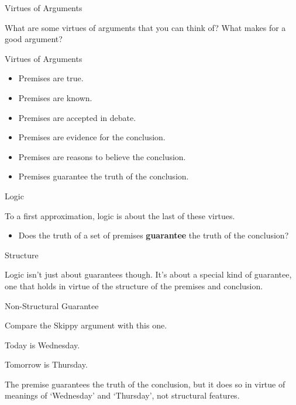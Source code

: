 \documentclass[ignorenonframetext,]{beamer}
\providecommand{\tightlist}{%
  \setlength{\itemsep}{0pt}\setlength{\parskip}{0pt}}
\renewcommand{\,}{\text{, }}
\renewenvironment*{quote}	
	{\list{}{\rightmargin   \leftmargin} \item } 	
	{\endlist }
\newcommand{\DisplayArg}[2]{
\begin{enumerate}
{#1}
\end{enumerate}
\vspace{-6pt}
\hrulefill

\begin{quote}
{\normalfont #2}
\end{quote}
\vspace{12pt}
}
\begin{document}
\begin{frame}{Virtues of Arguments}
\protect\hypertarget{virtues-of-arguments}{}

What are some virtues of arguments that you can think of? What makes for
a good argument?

\end{frame}

\begin{frame}{Virtues of Arguments}
\protect\hypertarget{virtues-of-arguments-1}{}

\begin{itemize}
\tightlist
\item
  Premises are true.
\item
  Premises are known.
\item
  Premises are accepted in debate.
\item
  Premises are evidence for the conclusion.
\item
  Premises are reasons to believe the conclusion.
\item
  Premises guarantee the truth of the conclusion.
\end{itemize}

\end{frame}

\begin{frame}{Logic}
\protect\hypertarget{logic}{}

To a first approximation, logic is about the last of these virtues.

\begin{itemize}
\tightlist
\item
  Does the truth of a set of premises \textbf{guarantee} the truth of
  the conclusion?
\end{itemize}

\end{frame}

\begin{frame}{Structure}
\protect\hypertarget{structure}{}

Logic isn't just about guarantees though. It's about a special kind of
guarantee, one that holds in virtue of the structure of the premises and
conclusion.

\end{frame}

\begin{frame}{Non-Structural Guarantee}
\protect\hypertarget{non-structural-guarantee}{}

Compare the Skippy argument with this one.

\DisplayArg{ \item Today is Wednesday. } { Tomorrow is Thursday. }

The premise guarantees the truth of the conclusion, but it does so in
virtue of meanings of `Wednesday' and `Thursday', not structural
features.

\end{frame}
\end{document}
